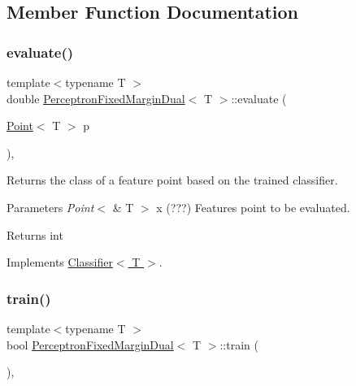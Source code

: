 \subsection{Member Function Documentation}
\mbox{\label{class_perceptron_fixed_margin_dual_acafabadf6d2552fde0bfb32f0344c6e3}} 
\subsubsection{\texorpdfstring{evaluate()}{evaluate()}}
{\footnotesize\ttfamily template$<$typename T $>$ \\
double \hyperlink{class_perceptron_fixed_margin_dual}{Perceptron\+Fixed\+Margin\+Dual}$<$ T $>$\+::evaluate (\begin{DoxyParamCaption}\item[{\hyperlink{class_point}{Point}$<$ T $>$}]{p }\end{DoxyParamCaption})\hspace{0.3cm}{\ttfamily [override]}, {\ttfamily [virtual]}}



Returns the class of a feature point based on the trained classifier. 


\begin{DoxyParams}{Parameters}
{\em Point$<$} & T $>$ x (???) Features point to be evaluated. \\
\hline
\end{DoxyParams}
\begin{DoxyReturn}{Returns}
int 
\end{DoxyReturn}


Implements \hyperlink{class_classifier_ab3b9544a8d9c3cbde8d5865c7e9be0fb}{Classifier$<$ T $>$}.

\mbox{\label{class_perceptron_fixed_margin_dual_a58a5acdd6afaedff53fab23779f01486}} 
\subsubsection{\texorpdfstring{train()}{train()}}
{\footnotesize\ttfamily template$<$typename T $>$ \\
bool \hyperlink{class_perceptron_fixed_margin_dual}{Perceptron\+Fixed\+Margin\+Dual}$<$ T $>$\+::train (\begin{DoxyParamCaption}{ }\end{DoxyParamCaption})\hspace{0.3cm}{\ttfamily [override]}, {\ttfamily [virtual]}}



